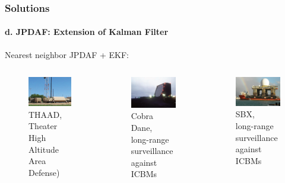 \begin{frame}
\frametitle{Solutions}
\framesubtitle{d. JPDAF: Extension of Kalman Filter}
\mypagenum
	Nearest neighbor JPDAF + EKF:
	\begin{columns}
		\begin{column}{1.0in}
			\begin{figure}
			{
				\includegraphics[width=1.0in]{figs/TRK_JPDAF_example_THAAD.jpg}
				\caption {THAAD, \\Theater High Altitude Area Defense)}
			}
			\end{figure}
		\end{column}
		\begin{column}{1.0in}
			\begin{figure}
			{
				\includegraphics[width=1.0in]{figs/TRK_JPDAF_example_Cobra.jpg}
				\caption {Cobra Dane,\\long-range surveillance against ICBMs}
			}
			\end{figure}
		\end{column}
		\begin{column}{1.0in}
			\begin{figure}
			{
				\includegraphics[width=1.0in]{figs/TRK_JPDAF_example_SBX.jpg}
				\caption {SBX,\\long-range surveillance against ICBMs}
			}
			\end{figure}
		\end{column}
	\end{columns}
\end{frame}



